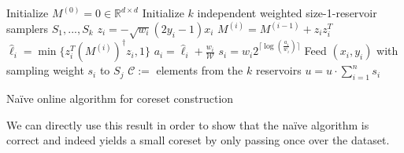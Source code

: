 \begin{algorithm}
    \DontPrintSemicolon
    Initialize $M^{(0)} = 0 \in \mathbb{R}^{d \times d}$ \;
    Initialize $k$ independent weighted size-1-reservoir
    samplers $S_1, ..., S_k$ \;
     {
        $z_i = -\sqrt{w_i} (2y_i - 1)x_i$
        $M^{(i)} = M^{(i-1)} + z_i z_i^T$
        $\hat{\ell}_i = \min\{z_i^T (M^{(i)})^\dagger z_i, 1\}$
        $a_i = \hat{\ell}_i + \frac{w_i}{\mathcal{W}}$
        $s_i = w_i 2^{\lceil\log(\frac{a_i}{w_i})\rceil}$
         {
            Feed $(x_i, y_i)$ with sampling weight $s_i$ to $S_j$ \;
        }
    }
    $\mathcal{C} := $ elements from the $k$ reservoirs \;
    $u = u \cdot \sum_{i=1}^n s_i$
    \caption{Na\"ive online algorithm for coreset construction\label{algo:online-naive}}
\end{algorithm}

We can directly use this result in order to show that the na\"ive
algorithm is correct and indeed yields a small coreset by
only passing once over the dataset.


